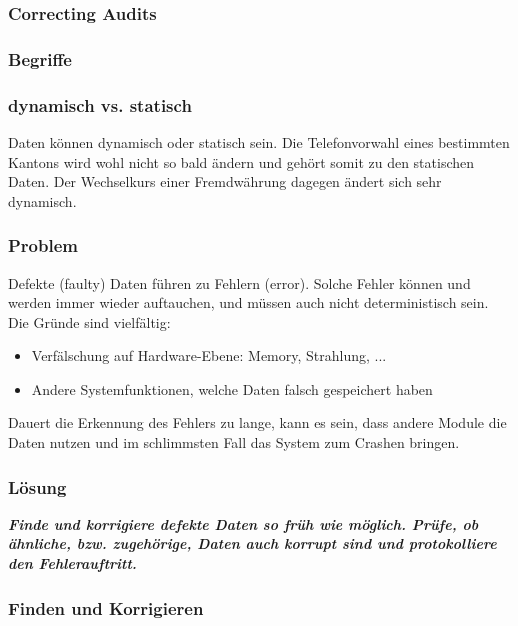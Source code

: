 \subsubsection*{Correcting Audits}

\subsubsection*{Begriffe}

\subsubsection*{dynamisch vs. statisch}

Daten können dynamisch oder statisch sein. Die Telefonvorwahl eines bestimmten Kantons wird wohl nicht so bald ändern und gehört somit zu den statischen Daten. Der Wechselkurs einer Fremdwährung dagegen ändert sich sehr dynamisch.

\subsubsection*{Problem}

Defekte (faulty) Daten führen zu Fehlern (error). Solche Fehler können und werden immer wieder auftauchen, und müssen auch nicht deterministisch sein. Die Gründe sind vielfältig:
\begin{itemize}
	\item Verfälschung auf Hardware-Ebene: Memory, Strahlung, ...
	\item Andere Systemfunktionen, welche Daten falsch gespeichert haben
\end{itemize}


Dauert die Erkennung des Fehlers zu lange, kann es sein, dass andere Module die Daten nutzen und im schlimmsten Fall das System zum Crashen bringen.

\subsubsection*{Lösung}

\textbf{\textit{Finde und korrigiere defekte Daten so früh wie möglich. Prüfe, ob ähnliche, bzw. zugehörige, Daten auch korrupt sind und protokolliere den Fehlerauftritt.}}

\subsubsection*{Finden und Korrigieren}

